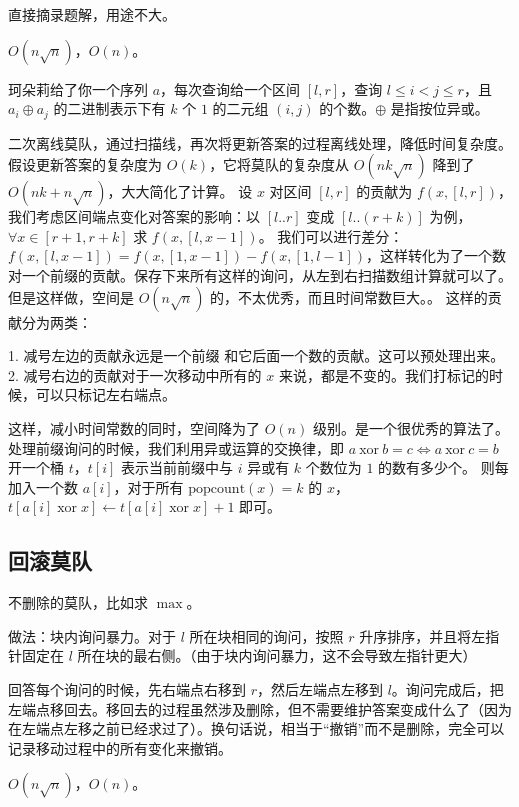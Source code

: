 \documentclass[12pt]{ctexart}
\begin{document}
直接摘录题解，用途不大。

$O(n\sqrt n)$，$O(n)$。

珂朵莉给了你一个序列 $a$，每次查询给一个区间 $[l,r]$，查询 $l \leq i< j \leq r$，且 $a_i \oplus a_j$ 的二进制表示下有 $k$ 个 $1$ 的二元组 $(i,j)$ 的个数。$\oplus$ 是指按位异或。

二次离线莫队，通过扫描线，再次将更新答案的过程离线处理，降低时间复杂度。假设更新答案的复杂度为 $O(k)$，它将莫队的复杂度从 $O(nk\sqrt n)$ 降到了 $O(nk + n\sqrt n)$，大大简化了计算。
设 $x$ 对区间 $[l,r]$ 的贡献为 $f(x,[l,r])$，我们考虑区间端点变化对答案的影响：以 $[l..r]$ 变成 $[l..(r+k)]$ 为例，$\forall x \in [r+1,r+k]$ 求 $f(x,[l,x-1])$。
我们可以进行差分：$f(x,[l,x-1])=f(x,[1,x-1])-f(x,[1,l-1])$，这样转化为了一个数对一个前缀的贡献。保存下来所有这样的询问，从左到右扫描数组计算就可以了。
但是这样做，空间是 $O(n\sqrt n)$ 的，不太优秀，而且时间常数巨大。。
这样的贡献分为两类：

1. 减号左边的贡献永远是一个前缀 和它后面一个数的贡献。这可以预处理出来。
2. 减号右边的贡献对于一次移动中所有的 $x$ 来说，都是不变的。我们打标记的时候，可以只标记左右端点。

这样，减小时间常数的同时，空间降为了 $O(n)$ 级别。是一个很优秀的算法了。处理前缀询问的时候，我们利用异或运算的交换律，即 $a~\mathrm{xor}~b=c \Longleftrightarrow a~\mathrm{xor}~c=b$
开一个桶 $t$，$t[i]$ 表示当前前缀中与 $i$ 异或有 $k$ 个数位为 $1$ 的数有多少个。
则每加入一个数 $a[i]$，对于所有 $\mathrm{popcount}(x)=k$ 的 $x$，$t[a[i]\operatorname{xor}x]\gets t[a[i]\operatorname{xor}x]+1$ 即可。



\subsection{回滚莫队}

不删除的莫队，比如求 $\max$。

做法：块内询问暴力。对于 $l$ 所在块相同的询问，按照 $r$ 升序排序，并且将左指针固定在 $l$ 所在块的最右侧。（由于块内询问暴力，这不会导致左指针更大）

回答每个询问的时候，先右端点右移到 $r$，然后左端点左移到 $l$。询问完成后，把左端点移回去。移回去的过程虽然涉及删除，但不需要维护答案变成什么了（因为在左端点左移之前已经求过了）。换句话说，相当于“撤销”而不是删除，完全可以记录移动过程中的所有变化来撤销。

$O(n\sqrt n)$，$O(n)$。


\end{document}
